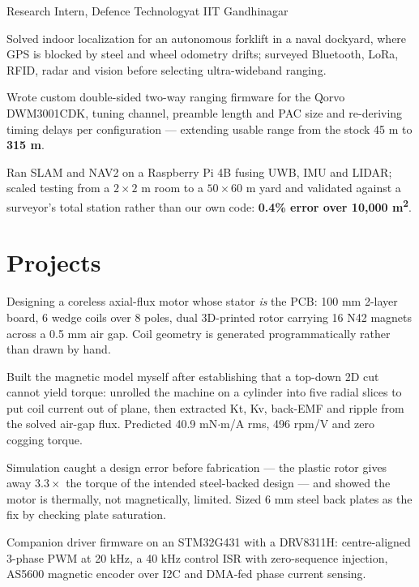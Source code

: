 \documentclass[a4paper,10pt]{article}
\begin{document}
      {Research Intern, Defence Technology}{at IIT Gandhinagar}
\begin{points}
  \item Solved indoor localization for an autonomous forklift in a naval dockyard, where GPS is blocked by steel and wheel odometry drifts; surveyed Bluetooth, LoRa, RFID, radar and vision before selecting ultra-wideband ranging.
  \item Wrote custom double-sided two-way ranging firmware for the Qorvo DWM3001CDK, tuning channel, preamble length and PAC size and re-deriving timing delays per configuration --- extending usable range from the stock 45 m to \textbf{315 m}.
  \item Ran SLAM and NAV2 on a Raspberry Pi 4B fusing UWB, IMU and LIDAR; scaled testing from a $2\times2$ m room to a $50\times60$ m yard and validated against a surveyor's total station rather than our own code: \textbf{0.4\% error over 10,000 m\textsuperscript{2}}.
\end{points}

\section{Projects}

\begin{points}
  \item Designing a coreless axial-flux motor whose stator \emph{is} the PCB: 100 mm 2-layer board, 6 wedge coils over 8 poles, dual 3D-printed rotor carrying 16 N42 magnets across a 0.5 mm air gap. Coil geometry is generated programmatically rather than drawn by hand.
  \item Built the magnetic model myself after establishing that a top-down 2D cut cannot yield torque: unrolled the machine on a cylinder into five radial slices to put coil current out of plane, then extracted Kt, Kv, back-EMF and ripple from the solved air-gap flux. Predicted 40.9 mN$\cdot$m/A rms, 496 rpm/V and zero cogging torque.
  \item Simulation caught a design error before fabrication --- the plastic rotor gives away $3.3\times$ the torque of the intended steel-backed design --- and showed the motor is thermally, not magnetically, limited. Sized 6 mm steel back plates as the fix by checking plate saturation.
  \item Companion driver firmware on an STM32G431 with a DRV8311H: centre-aligned 3-phase PWM at 20 kHz, a 40 kHz control ISR with zero-sequence injection, AS5600 magnetic encoder over I2C and DMA-fed phase current sensing.
\end{points}
\end{document}
